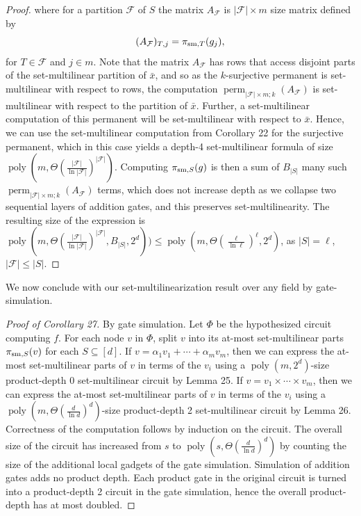 \documentclass[10pt,a4paper]{article}
\begin{document}
\begin{proof}
where for a partition $\mathcal F$ of $S$ the matrix $A_{\mathcal F}$ is $|\mathcal F|\times m$ size matrix defined by
\[(A_{\mathcal F})_{T,j}=\pi_{{\rm sm},T}(g_j),\]
for $T\in\mathcal F$ and $j\in m$. Note that the matrix $A_{\mathcal F}$ has rows that access disjoint parts of the set-multilinear partition of $\bar x$, and so as the $k$-surjective permanent is set-multilinear with respect to rows, the computation $\operatorname{perm}_{|\mathcal F|\times m;k}(A_{\mathcal F})$ is set-multilinear with respect to the partition of $\bar x$. Further, a set-multilinear computation of this permanent will be set-multilinear with respect to $\bar x$. Hence, we can use the set-multilinear computation from Corollary 22 for the surjective permanent, which in this case yields a depth-4 set-multilinear formula of size $\operatorname{poly}(m,\Theta(\frac{|\mathcal F|}{\ln|\mathcal F|})^{|\mathcal F|})$.
Computing $\pi_{{\rm sm},S}(g)$ is then a sum of $B_{|S|}$ many such $\operatorname{perm}_{|\mathcal F|\times m;k}(A_{\mathcal F})$ terms, which does not increase depth as we collapse two sequential layers of addition gates, and this preserves set-multilinearity. The resulting size of the expression is $\operatorname{poly}(m,\Theta(\frac{|\mathcal F|}{\ln|\mathcal F|})^{|\mathcal F|},B_{|S|},2^d))\le\operatorname{poly}(m,\Theta(\frac\ell{\ln\ell})^\ell,2^d)$, as $|S|=\ell$, $|\mathcal F|\le|S|$.
\end{proof}
We now conclude with our set-multilinearization result over any field by gate-simulation.
\begin{proof}[Proof of Corollary 27]
By gate simulation. Let $\Phi$ be the hypothesized circuit computing $f$. For each node $v$ in $\Phi$, split $v$ into its at-most set-multilinear parts $\pi_{{\rm sm},S}(v)$ for each $S\subseteq[d]$.
If $v=\alpha_1v_1+\cdots+\alpha_m v_m$, then we can express the at-most set-multilinear parts of $v$ in terms of the $v_i$ using a $\operatorname{poly}(m,2^d)$-size product-depth 0 set-multilinear circuit by Lemma 25. If $v=v_1\times\cdots\times v_m$, then we can express the at-most set-multilinear parts of $v$ in terms of the $v_i$ using a $\operatorname{poly}(m,\Theta(\frac d{\ln d})^d)$-size product-depth 2 set-multilinear circuit by Lemma 26.
Correctness of the computation follows by induction on the circuit.
The overall size of the circuit has increased from $s$ to $\operatorname{poly}(s,\Theta(\frac d{\ln d})^d)$ by counting the size of the additional local gadgets of the gate simulation. Simulation of addition gates adds no product depth. Each product gate in the original circuit is turned into a product-depth 2 circuit in the gate simulation, hence the overall product-depth has at most doubled.
\end{proof}
\end{document}
